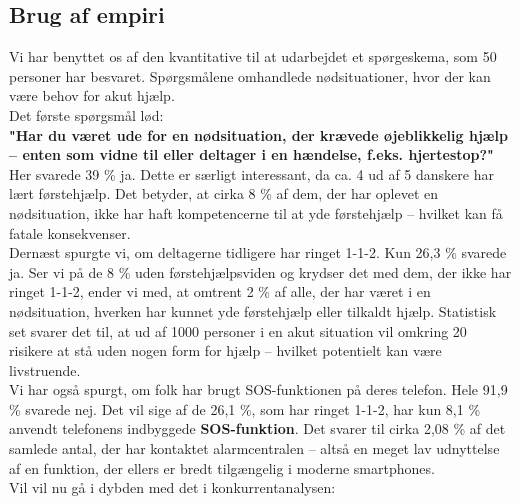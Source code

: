 \subsection{Brug af empiri}
Vi har benyttet os af den kvantitative til at udarbejdet et spørgeskema, som 50 personer har besvaret. Spørgsmålene omhandlede nødsituationer, hvor der kan være behov for akut hjælp.\\
Det første spørgsmål lød:\\
\textbf{"Har du været ude for en nødsituation, der krævede øjeblikkelig hjælp – enten som vidne til eller deltager i en hændelse, f.eks. hjertestop?"}\\
Her svarede 39 \% ja. Dette er særligt interessant, da ca. 4 ud af 5 danskere har lært førstehjælp. Det betyder, at cirka 8 \% af dem, der har oplevet en nødsituation, ikke har haft kompetencerne til at yde førstehjælp – hvilket kan få fatale konsekvenser. \\
Dernæst spurgte vi, om deltagerne tidligere har ringet 1-1-2. Kun 26,3 \% svarede ja. Ser vi på de 8 \% uden førstehjælpsviden og krydser det med dem, der ikke har ringet 1-1-2, ender vi med, at omtrent 2 \% af alle, der har været i en nødsituation, hverken har kunnet yde førstehjælp eller tilkaldt hjælp. Statistisk set svarer det til, at ud af 1000 personer i en akut situation vil omkring 20 risikere at stå uden nogen form for hjælp – hvilket potentielt kan være livstruende.\\
Vi har også spurgt, om folk har brugt SOS-funktionen på deres telefon. Hele 91,9 \% svarede nej. 
Det vil sige af de 26,1 \%, som har ringet 1-1-2, har kun 8,1 \% anvendt telefonens indbyggede \textbf{SOS-funktion}. Det svarer til cirka 2,08 \% af det samlede antal, der har kontaktet alarmcentralen – altså en meget lav udnyttelse af en funktion, der ellers er bredt tilgængelig i moderne smartphones.\\
Vil vil nu gå i dybden med det i konkurrentanalysen:

